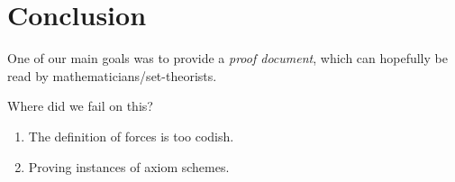 \section{Conclusion}
\label{sec:conclusion}

One of our main goals was to provide a \emph{proof document}, which
can hopefully be read by mathematicians/set-theorists.

Where did we fail on this?
\begin{enumerate}
\item
  The definition of forces is too codish.
\item
  Proving instances of axiom schemes.
\end{enumerate}

